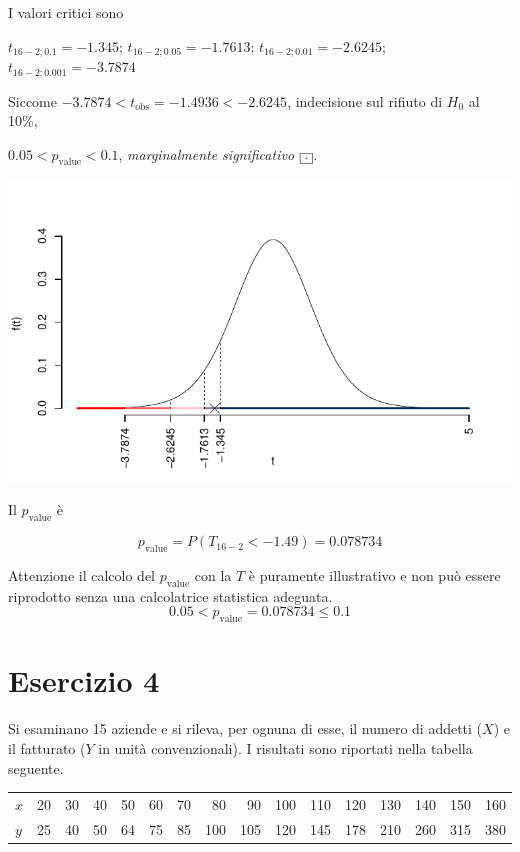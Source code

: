 \documentclass[
  11pt,
]{book}
\theoremstyle{mytheoremstyle}
\theoremstyle{mydefstyle}
\newenvironment{sol}
  {
  \begin{tcolorbox}[enhanced,breakable,arc=0.1mm,boxrule=1pt,colback=white,colframe=iblue,
  title=\bf \fontfamily{lmss}\selectfont \hspace{.5 cm} Soluzione,drop fuzzy shadow]

}{
\end{tcolorbox}
  }
\begin{document}
\begin{sol}
I valori critici sono

\(t_{16-2;0.1}=-1.345\); \(t_{16-2;0.05}=-1.7613\); \(t_{16-2;0.01}=-2.6245\); \(t_{16-2;0.001}=-3.7874\)

Siccome \(-3.7874<t_\text{obs}=-1.4936<-2.6245\), indecisione sul rifiuto di \(H_0\) al 10\%,

\(0.05<p_\text{value}<0.1\), \emph{marginalmente significativo} \(\fbox{.}\).

\begin{center}\includegraphics{Esami_passati_con_soluzioni_files/figure-latex/06-regr-21,-1} \end{center}

Il \(p_{\text{value}}\) è

\[ p_{\text{value}} = P(T_{16-2}<-1.49)=0.078734 \]

Attenzione il calcolo del \(p_\text{value}\) con la \(T\) è puramente illustrativo e non può essere riprodotto senza una calcolatrice statistica adeguata.\[
 0.05 < p_\text{value}= 0.078734 \leq 0.1 
\]

\end{sol}

\section{Esercizio 4}\label{esercizio-4-2}

Si esaminano 15 aziende e si rileva, per ognuna di esse,
il numero di addetti (\(X\)) e il fatturato (\(Y\) in unità
convenzionali).
I risultati sono riportati nella tabella seguente.

\begin{table}[H]
\centering
\begin{tabular}{lrrrrrrrrrrrrrrr}
\toprule
$x$ & 20 & 30 & 40 & 50 & 60 & 70 & 80 & 90 & 100 & 110 & 120 & 130 & 140 & 150 & 160\\
$y$ & 25 & 40 & 50 & 64 & 75 & 85 & 100 & 105 & 120 & 145 & 178 & 210 & 260 & 315 & 380\\
\bottomrule
\end{tabular}
\end{table}
\end{document}
